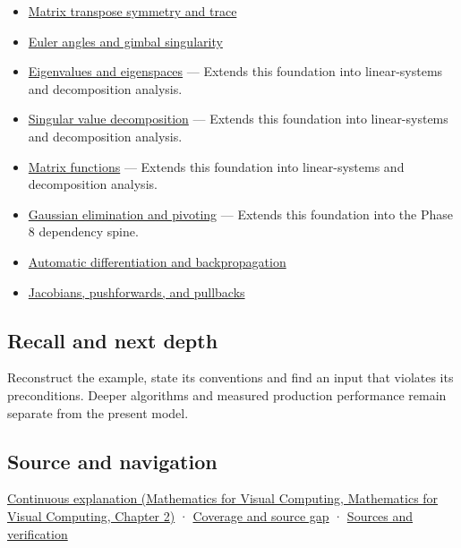 \begin{itemize}
\item
  \hyperref[appendix-175ca5ff874d]{Matrix transpose symmetry and trace}
\item
  \hyperref[appendix-5f723fbd0593]{Euler angles and gimbal singularity}
\item
  \hyperref[appendix-0b3be18411f9]{Eigenvalues and eigenspaces} --- Extends this foundation into linear-systems and decomposition analysis.
\item
  \hyperref[appendix-1fad5e7f36fa]{Singular value decomposition} --- Extends this foundation into linear-systems and decomposition analysis.
\item
  \hyperref[appendix-0f4bc2bf2b1f]{Matrix functions} --- Extends this foundation into linear-systems and decomposition analysis.
\item
  \hyperref[appendix-f6e77f4a200f]{Gaussian elimination and pivoting} --- Extends this foundation into the Phase 8 dependency spine.
\item
  \hyperref[appendix-40df0855b4a7]{Automatic differentiation and backpropagation}
\item
  \hyperref[appendix-d8a7ddb675eb]{Jacobians, pushforwards, and pullbacks}
\end{itemize}

\subsection{Recall and next depth}\label{appendix-ab31ef447dbf-recall-and-next-depth}

Reconstruct the example, state its conventions and find an input that violates its preconditions. Deeper algorithms and measured production performance remain separate from the present model.

\subsection{Source and navigation}\label{appendix-ab31ef447dbf-source-and-navigation}

\href{../02-Mathematics-for-Visual-Computing/main.pdf\#nameddest=01-foundations-i-ch018-keep-the-promises-visible-while-moving-between-representations}{Continuous explanation (Mathematics for Visual Computing, Mathematics for Visual Computing, Chapter 2)} · \hyperref[appendix-fd090d982a15-phase-7---parts-601-700]{Coverage and source gap} · \hyperref[appendix-a103e7846d21-phase-7---source-analysis-and-verification]{Sources and verification}

